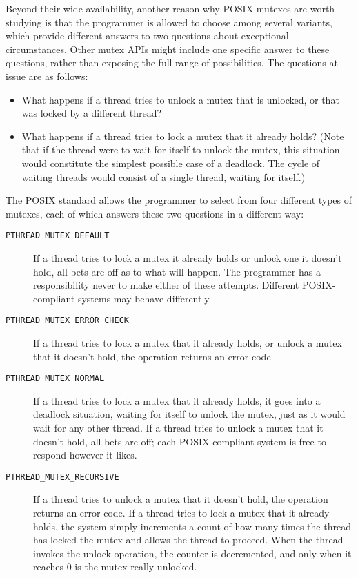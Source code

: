 Beyond their wide availability, another reason why POSIX mutexes are
worth studying is that the programmer is allowed to choose among several
variants, which provide different answers to two questions about exceptional
circumstances.
Other mutex APIs might include one specific answer to these questions,
rather than exposing the full range of possibilities.  The questions
at issue are as follows:
\begin{itemize}
\item
What happens if a thread tries to unlock a mutex that is unlocked, or that was locked by a
different thread?
\item
What happens if a thread tries to lock a mutex that it already holds?
(Note that if the thread were to wait for itself to unlock the mutex,
this situation would constitute the simplest possible case of a deadlock.  The cycle of
waiting threads would consist of a single thread, waiting for itself.)
\end{itemize}

The POSIX standard allows the programmer to select from four different
types of mutexes, each of which answers these two questions in a
different way:
\begin{description}
\item[\texttt{PTHREAD\_MUTEX\_DEFAULT}]
If a thread tries to
lock a mutex it already holds or unlock one it doesn't hold, all bets are off as to what will happen.
The programmer has a responsibility never to make either of these attempts.
Different POSIX-compliant systems may behave differently.
\item[\texttt{PTHREAD\_MUTEX\_ERROR\_CHECK}]
If a thread tries to lock a mutex that it already holds, or unlock a
mutex that it doesn't hold, the operation returns an error code.
\item[\texttt{PTHREAD\_MUTEX\_NORMAL}]
If a thread tries to lock a mutex that it already holds, it goes into
a deadlock situation, waiting for itself to unlock the mutex, just
as it would wait for any other thread.  If a thread tries to unlock
a mutex that it doesn't hold, all bets are off; each POSIX-compliant
system is free to respond however it likes.
\item[\texttt{PTHREAD\_MUTEX\_RECURSIVE}]
If a thread tries to unlock a mutex that it doesn't hold, the
operation returns an error code.  If a thread tries to lock a mutex
that it already holds, the system simply increments a count of how
many times the thread has locked the mutex and allows the thread to
proceed.  When the thread invokes the unlock operation, the counter is
decremented, and only when it reaches 0 is the mutex really unlocked.
\end{description}

